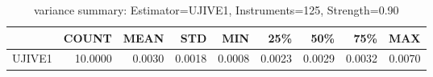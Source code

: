 \begin{table}[ht]
\centering
\caption{variance summary: Estimator=UJIVE1, Instruments=125, Strength=0.90}
\begin{tabular}{lrrrrrrrr}
\toprule
 & COUNT & MEAN & STD & MIN & 25\% & 50\% & 75\% & MAX \\
\midrule
UJIVE1 & 10.0000 & 0.0030 & 0.0018 & 0.0008 & 0.0023 & 0.0029 & 0.0032 & 0.0070 \\
\bottomrule
\end{tabular}
\end{table}
